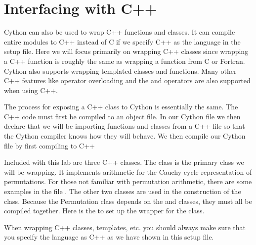 \newcommand{\of}{\texttt{.o}~}

\label{lab:cythonwrap_cpp}








\section*{Interfacing with C++}
Cython can also be used to wrap C++ functions and classes.
It can compile entire modules to C++ instead of C if we specify C++ as the language in the setup file.
Here we will focus primarily on wrapping C++ classes since wrapping a C++ function is roughly the same as wrapping a function from C or Fortran.
Cython also supports wrapping templated classes and functions.
Many other C++ features like operator overloading and the  and  operators are also supported when using C++.

The process for exposing a C++ class to Cython is essentially the same.
The C++ code must first be compiled to an object file.
In our Cython file we then declare that we will be importing functions and classes from a C++ file so that the Cython compiler knows how they will behave.
We then compile our Cython file by first compiling to C++

Included with this lab are three C++ classes.
The  class is the primary class we will be wrapping.
It implements arithmetic for the Cauchy cycle representation of permutations.
For those not familiar with permutation arithmetic, there are some examples in the file .
The other two classes are used in the construction of the  class.
Because the Permutation class depends on the  and  classes, they must all be compiled together.
Here is the  to set up the wrapper for the  class.



\begin{warn}
When wrapping C++ classes, templates, etc. you should always make sure that you specify the language as C++ as we have shown in this setup file.
\end{warn}

